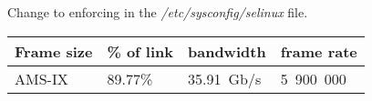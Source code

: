 
Change to enforcing in the {\it{/etc/sysconfig/selinux}} file.

\begin{tabular}{ | l | l | l | l | }
\hline
Frame size & \% of link & bandwidth & frame rate \\
\hline
AMS-IX & 89.77\% & 35.91~Gb/s & 5~900~000 \\
\hline
\end{tabular}
